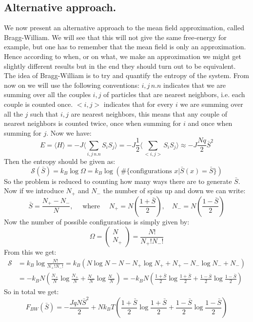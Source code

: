 \documentclass[10pt,a4paper]{book}
\begin{document}
\subsection{Alternative approach.}
We now present an alternative approach to the mean field approximation, called Bragg-William. We will see that this will not give the same free-energy for example, but one has to remember that the mean field is only an approximation. Hence according to when, or on what, we make an approximation we might get slightly different results but in the end they should turn out to be equivalent. The idea of Bragg-William is to try and quantify the entropy of the system. From now on we will use the following conventions: $i,j\, n.n$ indicates that we are summing over all the couples $i,j$ of particles that are nearest neighbors, i.e. each couple is counted once. $<i,j>$ indicates that for every $i$ we are summing over all the $j$ such that $i,j$ are nearest neighbors, this means that any couple of nearest neighbors is counted twice, once when summing for $i$ and once when summing for $j$. Now we have:
\[
E = \langle H \rangle = - J \langle \sum_{i,j\, n.n} S_i S_j \rangle = - J \frac{1}{2} \langle \sum_{<i,j>} S_i S_j \rangle \approx - J \frac{N q}{2} \bar{S}^2
\]
Then the entropy should be given as:
\[
\mathcal{S}(\bar{S}) = k_B \log \Omega = k_B \log(\#\{\text{configurations } x | \bar{S}(x) = \bar{S}\})
\]
So the problem is reduced to counting how many ways there are to generate $\bar{S}$. Now if we introduce $N_+$ and $N_-$ the number of spins up and down we can write:
\[
\bar{S} = \frac{N_+ - N_-}{N}, \quad \text{ where } \quad N_+ = N\left(\frac{1 + \bar{S}}{2}\right), \quad N_- = N\left(\frac{1-\bar{S}}{2}\right)
\]
Now the number of possible configurations is simply given by:
\[
\Omega = \begin{pmatrix}
N\\N_+
\end{pmatrix}
= \frac{N!}{N_+!N_-!}
\]
From this we get:
\begin{align*}
\mathcal{S} &= k_B \log \frac{N!}{N_+!N_-!} = k_B \left( N\log N - N - N_+\log N_+ + N_+ - N_-\log N_- + N_-  \right)\\
& = -k_B N (\frac{N_+}{N} \log \frac{N_+}{N} + \frac{N_-}{N} \log \frac{N_-}{N})
 = -k_B N \left(\frac{1 + \bar{S}}{2}\log \frac{1 + \bar{S}}{2} + \frac{1 -\bar{S}}{2}\log\frac{1-\bar{S}}{2}\right)
\end{align*}
So in total we get:
\[
F_{BW}(\bar{S}) = -\frac{JqN\bar{S}^2}{2} + Nk_B T\left(\frac{1 + \bar{S}}{2}\log \frac{1 + \bar{S}}{2} + \frac{1 -\bar{S}}{2}\log\frac{1-\bar{S}}{2}\right)
\]
\end{document}
